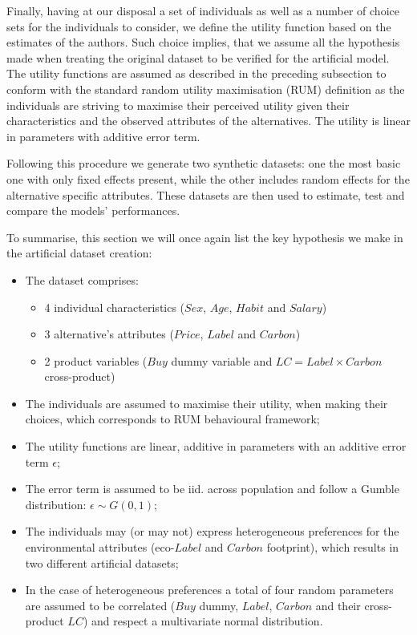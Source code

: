 \documentclass[11pt,]{article}
\providecommand{\tightlist}{%
  \setlength{\itemsep}{0pt}\setlength{\parskip}{0pt}}
\begin{document}
Finally, having at our disposal a set of individuals as well as a number
of choice sets for the individuals to consider, we define the utility
function based on the estimates of the authors. Such choice implies,
that we assume all the hypothesis made when treating the original
dataset to be verified for the artificial model. The utility functions
are assumed as described in the preceding subsection to conform with the
standard random utility maximisation (RUM) definition as the individuals
are striving to maximise their perceived utility given their
characteristics and the observed attributes of the alternatives. The
utility is linear in parameters with additive error term.

Following this procedure we generate two synthetic datasets: one the
most basic one with only fixed effects present, while the other includes
random effects for the alternative specific attributes. These datasets
are then used to estimate, test and compare the models' performances.

To summarise, this section we will once again list the key hypothesis we
make in the artificial dataset creation:

\begin{itemize}
\tightlist
\item
  The dataset comprises:

  \begin{itemize}
  \tightlist
  \item
    4 individual characteristics (\(Sex\), \(Age\), \(Habit\) and
    \(Salary\))
  \item
    3 alternative's attributes (\(Price\), \(Label\) and \(Carbon\))
  \item
    2 product variables (\(Buy\) dummy variable and
    \(LC = Label \times Carbon\) cross-product)
  \end{itemize}
\item
  The individuals are assumed to maximise their utility, when making
  their choices, which corresponds to RUM behavioural framework;
\item
  The utility functions are linear, additive in parameters with an
  additive error term \(\epsilon\);
\item
  The error term is assumed to be iid. across population and follow a
  Gumble distribution: \(\epsilon \sim G(0, 1)\);
\item
  The individuals may (or may not) express heterogeneous preferences for
  the environmental attributes (eco-\(Label\) and \(Carbon\) footprint),
  which results in two different artificial datasets;
\item
  In the case of heterogeneous preferences a total of four random
  parameters are assumed to be correlated (\(Buy\) dummy, \(Label\),
  \(Carbon\) and their cross-product \(LC\)) and respect a multivariate
  normal distribution.
\end{itemize}
\end{document}
